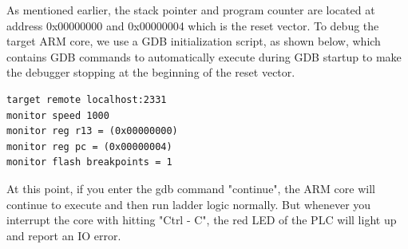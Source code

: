 As mentioned earlier, the stack pointer and program counter are located at address 0x00000000 and 0x00000004 which is the reset vector. To debug the target ARM core, we use a GDB initialization script, as shown below, which contains GDB commands to automatically execute during GDB startup to make the debugger stopping at the beginning of the reset vector.  

\begin{lstlisting}[basicstyle=\small, caption={GDB stript file .gdbinit}, captionpos=b]
target remote localhost:2331
monitor speed 1000
monitor reg r13 = (0x00000000)
monitor reg pc = (0x00000004)
monitor flash breakpoints = 1
\end{lstlisting}

At this point, if you enter the gdb command "continue", the ARM core will continue to execute and then run ladder logic normally. But whenever you interrupt the core with hitting "Ctrl - C", the red LED of the PLC will light up and report an IO error. 
